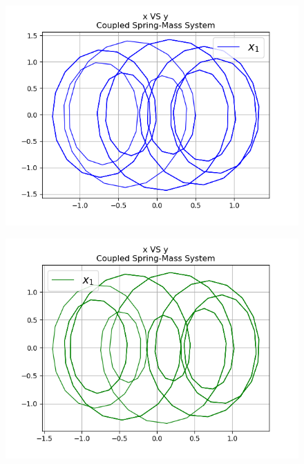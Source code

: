 \documentclass{article}
\begin{document}
\begin{figure}[h]
\centering
\includegraphics[scale=0.5]{r10.png}
\label{figure: Resortes acoplados }
\end{figure}

\begin{figure}[h]
\centering
\includegraphics[scale=0.5]{r11.png}
\label{figure: Resortes acoplados }
\end{figure}
\end{document}
